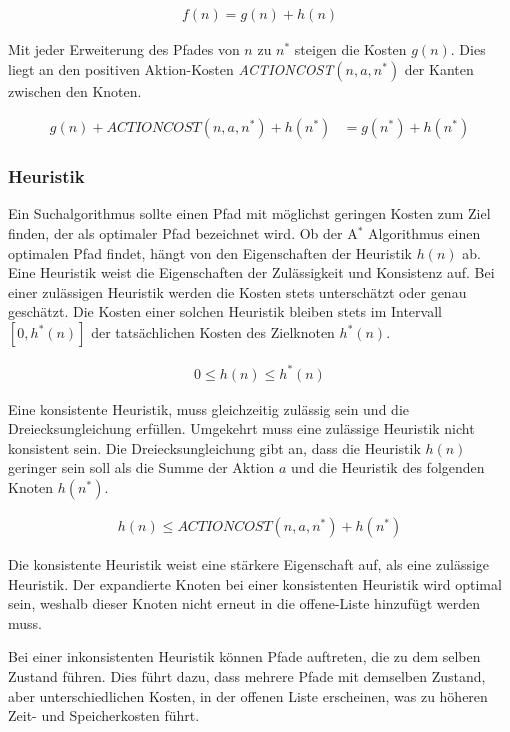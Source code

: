 \begin{align}
	f(n) = g(n) + h(n)
\end{align}


Mit jeder Erweiterung des Pfades von $n$ zu $n^{\ast}$ steigen die Kosten $g(n)$. Dies liegt an den positiven Aktion-Kosten \textit{ACTIONCOST}$(n,a,n^*)$ der Kanten zwischen den Knoten.


\begin{align}
	g(n) + \textit{ACTIONCOST}(n,a,n^*) + h(n^*) &= g(n^*) + h(n^*)
\end{align}

\subsubsection{Heuristik}

Ein Suchalgorithmus sollte einen Pfad mit möglichst geringen Kosten zum Ziel finden, der als optimaler Pfad bezeichnet wird. Ob der A$^*$ Algorithmus einen optimalen Pfad findet, hängt von den Eigenschaften der Heuristik $h(n)$ ab. Eine Heuristik weist die Eigenschaften der Zulässigkeit und Konsistenz auf. Bei einer zulässigen Heuristik werden die Kosten stets unterschätzt oder genau geschätzt. Die Kosten einer solchen Heuristik bleiben stets im Intervall $[0, h^{\ast}(n)]$ der tatsächlichen Kosten des Zielknoten $h^{\ast}(n)$.

\begin{align}
			0 \leq h(n) \leq h^*(n)
\end{align}

Eine konsistente Heuristik, muss gleichzeitig zulässig sein und die Dreiecksungleichung erfüllen. Umgekehrt muss eine zulässige Heuristik nicht konsistent sein. Die Dreiecksungleichung gibt an, dass die Heuristik $h(n)$ geringer sein soll als die Summe der Aktion $a$ und die Heuristik des folgenden Knoten $h(n^*)$.


\begin{align}
	h(n) \leq \textit{ACTIONCOST}(n,a,n^*) + h(n^*)
\end{align}

Die konsistente Heuristik weist eine stärkere Eigenschaft auf, als eine zulässige Heuristik. Der expandierte Knoten bei einer konsistenten Heuristik wird optimal sein, weshalb dieser Knoten nicht erneut in die offene-Liste hinzufügt werden muss.

Bei einer inkonsistenten Heuristik können Pfade auftreten, die zu dem selben Zustand führen. Dies führt dazu, dass mehrere Pfade mit demselben Zustand, aber unterschiedlichen Kosten, in der offenen Liste erscheinen, was zu höheren Zeit- und Speicherkosten führt.

